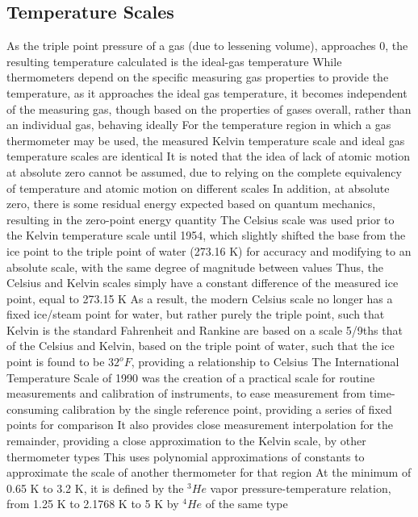 \documentclass[11 pt, twoside]{article}
\newenvironment{outline*}
{
	\begin{outline}[enumerate]
	}
	{\end{outline}
}
\begin{document}
\subsection{Temperature Scales}
\begin{outline*}
\1 As the triple point pressure of a gas (due to lessening volume), approaches 0, the resulting temperature calculated is the ideal-gas temperature
\2 While thermometers depend on the specific measuring gas properties to provide the temperature, as it approaches the ideal gas temperature, it becomes independent of the measuring gas, though based on the properties of gases overall, rather than an individual gas, behaving ideally
\2 For the temperature region in which a gas thermometer may be used, the measured Kelvin temperature scale and ideal gas temperature scales are identical
\2 It is noted that the idea of lack of atomic motion at absolute zero cannot be assumed, due to relying on the complete equivalency of temperature and atomic motion on different scales 
\3 In addition, at absolute zero, there is some residual energy expected based on quantum mechanics, resulting in the zero-point energy quantity
\1 The Celsius scale was used prior to the Kelvin temperature scale until 1954, which slightly shifted the base from the ice point to the triple point of water (273.16 K) for accuracy and modifying to an absolute scale, with the same degree of magnitude between values
\2 Thus, the Celsius and Kelvin scales simply have a constant difference of the measured ice point, equal to 273.15 K
\2 As a result, the modern Celsius scale no longer has a fixed ice/steam point for water, but rather purely the triple point, such that Kelvin is the standard
\1 Fahrenheit and Rankine are based on a scale 5/9ths that of the Celsius and Kelvin, based on the triple point of water, such that the ice point is found to be $32^o F$, providing a relationship to Celsius
\1 The International Temperature Scale of 1990 was the creation of a practical scale for routine measurements and calibration of instruments, to ease measurement from time-consuming calibration by the single reference point,  providing a series of fixed points for comparison
\2 It also provides close measurement interpolation for the remainder, providing a close approximation to the Kelvin scale, by other thermometer types
\3 This uses polynomial approximations of constants to approximate the scale of another thermometer for that region
\2 At the minimum of 0.65 K to 3.2 K, it is defined by the $^3He$ vapor pressure-temperature relation, from 1.25 K to 2.1768 K to 5 K by $^4He$ of the same type

\end{outline*}
\end{document}
